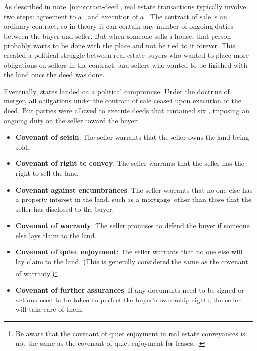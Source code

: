 
As described in note~\ref{n:contract-deed}, real estate transactions typically
involve two steps: agreement to a , and execution of a
. The contract of sale is an ordinary contract, so in theory it
can contain any number of ongoing duties between the buyer and seller. But when
someone sells a house, that person probably wants to be done with the place and
not be tied to it forever. This created a political struggle between real estate
buyers who wanted to place more obligations on sellers in the contract, and
sellers who wanted to be finished with the land once the deed was done.

Eventually, states landed on a political compromise. Under the doctrine of
merger, all obligations under the contract of sale ceased upon execution of the
deed. But parties were allowed to execute deeds that contained six
, imposing an ongoing duty on the
seller toward the buyer:
\begin{itemize}
\item \textbf{Covenant of seisin}: The seller warrants that the seller owns
the land being sold.
\item \textbf{Covenant of right to convey}: The seller warrants that the seller
has the right to sell the land.
\item \textbf{Covenant against encumbrances}: The seller warrants that no one
else has a property interest in the land, such as a mortgage, other than those
that the seller has disclosed to the buyer.
\item \textbf{Covenant of warranty}: The seller promises to defend the buyer if
someone else lays claim to the land.

\item \textbf{Covenant of quiet enjoyment}: The seller warrants that no one else
will lay claim to the land. (This is generally considered the same as the
covenant of warranty.)\footnote{Be aware that the covenant of quiet enjoyment in
real estate conveyances is not the same as the covenant of quiet enjoyment for
leases, .}

\item \textbf{Covenant of further assurances}: If any documents need to be
signed or actions need to be taken to perfect the buyer's ownership rights, the
seller will take care of them.
\end{itemize}
